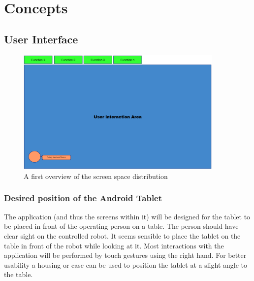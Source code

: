 \chapter{Concepts}
\label{chap:concepts}

\section{User Interface}

\begin{figure}
	\caption{\label{fig:firstmockup}A first overview of the screen space distribution}
	\includegraphics[width=0.9\textwidth]{assets/chpt_concepts/main_touch_interface.png}
\end{figure}

\subsection{Desired position of the Android Tablet}
The application (and thus the screens within it) will be designed for the tablet to be placed in front of the operating person on a table. The person should have clear sight on the controlled robot. It seems sensible to place the tablet on the table in front of the robot while looking at it. Most interactions with the application will be performed by touch gestures using the right hand. For better usability a housing or case can be used to position the tablet at a slight angle to the table. 

